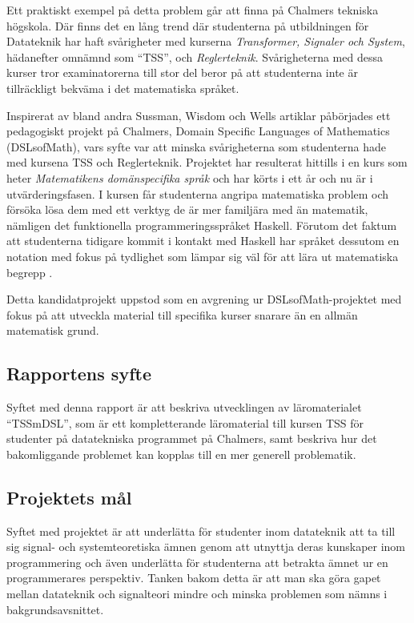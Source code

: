 \documentclass[]{article}
\begin{document}
Ett praktiskt exempel på detta problem går att finna på Chalmers tekniska högskola.
Där finns det en lång trend där studenterna på utbildningen för Datateknik har
haft svårigheter med kurserna \textit{Transformer, Signaler och System}, hädanefter
omnämnd som ``\gls{TSS}'', och \textit{Reglerteknik}.
Svårigheterna med dessa kurser tror examinatorerna till stor del beror på att
studenterna inte är tillräckligt bekväma i det matematiska språket.

Inspirerat av bland andra Sussman, Wisdom och Wells artiklar påbörjades ett
pedagogiskt projekt på Chalmers, Domain Specific Languages of Mathematics (\gls{DSLsofMath}), vars syfte var att minska
svårigheterna som studenterna hade med kursena TSS och Reglerteknik.
Projektet har resulterat hittills i en kurs som heter
\textit{Matematikens domänspecifika språk} och har körts i ett år och nu
är i utvärderingsfasen. I kursen får studenterna angripa
matematiska problem och försöka lösa dem med ett verktyg de är
mer familjära med än matematik, nämligen det funktionella
programmerings\-språket Haskell. Förutom det faktum att studenterna tidigare
kommit i kontakt med Haskell har språket dessutom en notation med fokus på
tydlighet som lämpar sig väl för att lära ut matematiska begrepp
\cite{TFPIE15_DSLsofMath_IonescuJansson}.

Detta kandidatprojekt uppstod som en avgrening ur DSLsofMath-projektet med fokus
på att utveckla material till specifika kurser snarare än en allmän matematisk grund.

\subsection{Rapportens syfte}


Syftet med denna rapport är att beskriva utvecklingen av läromaterialet
``\gls{TSSmDSL}'', som är ett kompletterande läromaterial till kursen TSS
för studenter på datatekniska programmet på Chalmers, samt beskriva hur det
bakomliggande problemet kan kopplas till en mer generell problematik.

\subsection{Projektets mål}
Syftet med projektet är att underlätta för studenter inom datateknik att
ta till sig signal- och systemteoretiska ämnen genom att utnyttja deras
kunskaper inom programmering och även underlätta för studenterna att betrakta
ämnet ur en programmerares perspektiv. Tanken bakom detta är att man ska göra
gapet mellan datateknik och signalteori mindre och minska problemen som nämns
i bakgrundsavsnittet.
\end{document}
